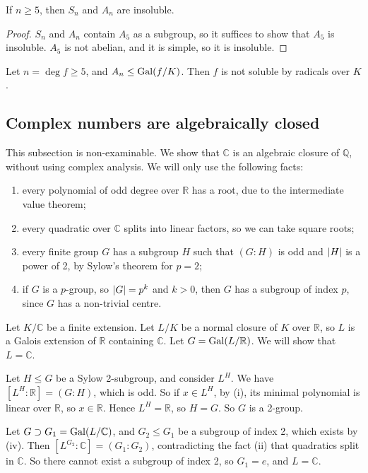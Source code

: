 \begin{proposition}
	If \( n \geq 5 \), then \( S_n \) and \( A_n \) are insoluble.
\end{proposition}
\begin{proof}
	\( S_n \) and \( A_n \) contain \( A_5 \) as a subgroup, so it suffices to show that \( A_5 \) is insoluble.
	\( A_5 \) is not abelian, and it is simple, so it is insoluble.
\end{proof}
\begin{corollary}
	Let \( n = \deg f \geq 5 \), and \( A_n \leq \operatorname{Gal}(f/K) \).
	Then \( f \) is not soluble by radicals over \( K \).
\end{corollary}

\subsection{Complex numbers are algebraically closed}
This subsection is non-examinable.
We show that \( \mathbb C \) is an algebraic closure of \( \mathbb Q \), without using complex analysis.
We will only use the following facts:
\begin{enumerate}
	\item every polynomial of odd degree over \( \mathbb R \) has a root, due to the intermediate value theorem;
	\item every quadratic over \( \mathbb C \) splits into linear factors, so we can take square roots;
	\item every finite group \( G \) has a subgroup \( H \) such that \( (G:H) \) is odd and \( \lvert H\rvert \) is a power of 2, by Sylow's theorem for \( p = 2 \);
	\item if \( G \) is a \( p \)-group, so \( \lvert G\rvert = p^k \) and \( k > 0 \), then \( G \) has a subgroup of index \( p \), since \( G \) has a non-trivial centre.
\end{enumerate}
Let \( K / \mathbb C \) be a finite extension.
Let \( L / K \) be a normal closure of \( K \) over \( \mathbb R \), so \( L \) is a Galois extension of \( \mathbb R \) containing \( \mathbb C \).
Let \( G = \operatorname{Gal}(L/\mathbb R) \).
We will show that \( L = \mathbb C \).

Let \( H \leq G \) be a Sylow 2-subgroup, and consider \( L^H \).
We have \( [L^H:\mathbb R] = (G:H) \), which is odd.
So if \( x \in L^H \), by (i), its minimal polynomial is linear over \( \mathbb R \), so \( x \in \mathbb R \).
Hence \( L^H = \mathbb R \), so \( H = G \).
So \( G \) is a 2-group.

Let \( G \supset G_1 = \operatorname{Gal}(L/\mathbb C) \), and \( G_2 \leq G_1 \) be a subgroup of index 2, which exists by (iv).
Then \( [L^{G_2}:\mathbb C] = (G_1 : G_2) \), contradicting the fact (ii) that quadratics split in \( \mathbb C \).
So there cannot exist a subgroup of index 2, so \( G_1 = {e} \), and \( L = \mathbb C \).

